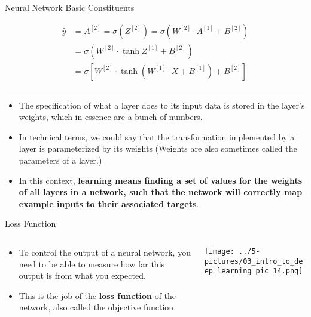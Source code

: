 \documentclass[11pt]{beamer}
\begin{document}
\begin{frame}{Neural Network Basic Constituents}
\scriptsize

\begin{align*}
\hat y &= A^{[2]} = \sigma\left(Z^{[2]}\right) = \sigma \left( W^{[2]} \cdot A^{[1]} + B^{[2]} \right) \\
&= \sigma \left( W^{[2]} \cdot \tanh{Z^{[1]}} + B^{[2]} \right) \\
&= \sigma \left[ W^{[2]} \cdot \tanh\left( W^{[1]} \cdot X + B^{[1]} \right) + B^{[2]} \right]
\end{align*}

\rule{\textwidth}{1pt}
\begin{itemize}
		\item The specification of what a layer does to its input data is stored in the layer's weights, which in essence are a bunch of numbers. 
		\item In technical terms, we could say that the transformation implemented by a layer is parameterized by its weights (Weights are also sometimes called the parameters of a layer.) 
		\item In this context, \textbf{learning means finding a set of values for the weights of all layers in a network, such that the network will correctly map example inputs to their associated targets}.
	\end{itemize}
\end{frame}
\begin{frame}{Loss Function}
\begin{columns}[T] %
\begin{column}{.48\textwidth}
        \begin{itemize}
		\item To control the output of a neural network, you need to be able to measure how far this output is from what you expected. 
		\item This is the job of the \textbf{loss function} of the network, also called the objective function. 
        \end{itemize}
\end{column}%
\hfill%
\begin{column}{.48\textwidth}
        \texttt{[image: ../5-pictures/03\_intro\_to\_deep\_learning\_pic\_14.png]}
\end{column}%
\end{columns}
\end{frame}
\end{document}
